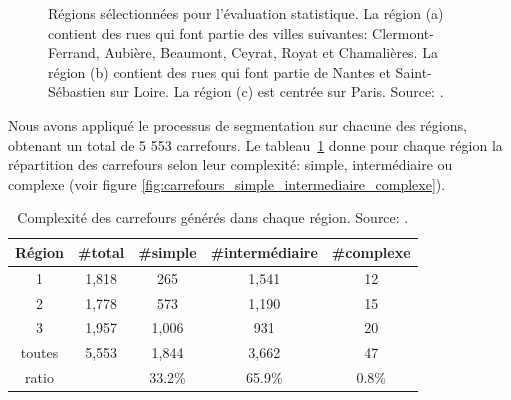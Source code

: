 \begin{figure}[H]
\begin{subfigure}[t]{0.32\linewidth}
        \caption{}
        \label{fig:parisRegion}
    \end{subfigure}
    \caption[Régions sélectionnées pour l'évaluation statistique]{Régions sélectionnées pour l'évaluation statistique. La région (a) contient des rues qui font partie des villes suivantes: Clermont-Ferrand, Aubière, Beaumont, Ceyrat, Royat et Chamalières. La région (b) contient des rues qui font partie de Nantes et Saint-Sébastien sur Loire. La région (c) est centrée sur Paris. Source: \citep{Favreau2022}.}
    \label{fig:regions}
\end{figure}

\pagebreak

Nous avons appliqué le processus de segmentation sur chacune des régions, obtenant un total de 5 553 carrefours. Le tableau~\ref{tab:initRegions} donne pour chaque région la répartition des carrefours selon leur complexité: simple, intermédiaire ou complexe (voir figure \ref{fig:carrefours_simple_intermediaire_complexe}). 

\begin{table}[ht] 
    \centering
    \footnotesize
    \begin{tabular}{c|c|c|c|c}
    Région & \#total & \#simple &\#intermédiaire & \#complexe \\
    \hline
     1 & 1,818 & 265 & 1,541  & 12 \\
     2 & 1,778 & 573 & 1,190 & 15 \\
     3 & 1,957 & 1,006 & 931  & 20 \\
     \hline
     toutes & 5,553  & 1,844 & 3,662 &  47  \\
     \hline
     ratio & & 33.2\% & 65.9\% & 0.8\% \\
    \end{tabular}
    \caption[Complexité des carrefours générés dans chaque région]{Complexité des carrefours générés dans chaque région. Source: \citep{Favreau2022}.}
    \label{tab:initRegions}
\end{table}

